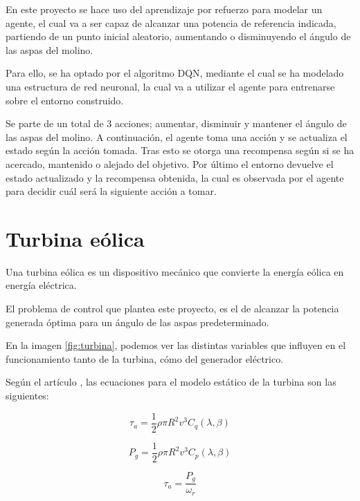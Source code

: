En este proyecto se hace uso del aprendizaje por refuerzo para modelar un agente, el cual va a ser capaz de alcanzar una potencia de referencia indicada, partiendo de un punto inicial aleatorio, aumentando o disminuyendo el ángulo de las aspas del molino.

Para ello, se ha optado por el algoritmo DQN, mediante el cual se ha modelado una estructura de red neuronal, la cual va a utilizar el agente para entrenarse sobre el entorno construido.

Se parte de un total de 3 acciones; aumentar, disminuir y mantener el ángulo de las aspas del molino. A continuación, el agente toma una acción y se actualiza el estado según la acción tomada. Tras esto se otorga una recompensa según si se ha acercado, mantenido o alejado del objetivo.
Por último el entorno devuelve el estado actualizado y la recompensa obtenida, la cual es observada por el agente para decidir cuál será la siguiente acción a tomar.


\section{Turbina eólica}

Una turbina eólica es un dispositivo mecánico que convierte la energía eólica en energía eléctrica.

El problema de control que plantea este proyecto, es el de alcanzar la potencia generada óptima para un ángulo de las aspas predeterminado.

\label{fig:turbina}

En la imagen \ref{fig:turbina}, podemos ver las distintas variables que influyen en el funcionamiento tanto de la turbina, cómo del generador eléctrico.

Según el artículo \cite{control_multivariable}, las ecuaciones para el modelo estático de la turbina son las siguientes:

\begin{equation}
    \tau_{a} = \frac{1}{2} \rho \pi R^2 v^3 C_{q}(\lambda,\beta)
    \label{eq:torque}
\end{equation}

\begin{equation}
    P_{g} = \frac{1}{2} \rho \pi R^2 v^3 C_{p}(\lambda,\beta)
    \label{eq:potenciaGenerada}
\end{equation}

\begin{equation}
    \tau_{a} = \frac{P_{g}}{\omega_{r}}
    \label{eq:relacionPotenciaTorque}
\end{equation}

